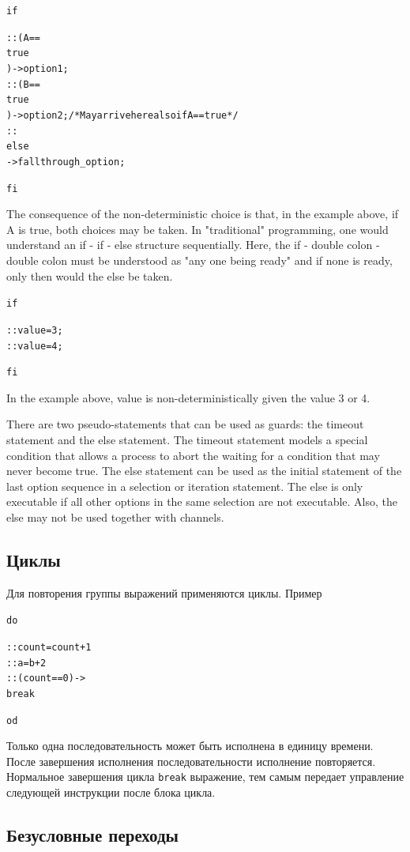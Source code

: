\documentclass[12pt, twoside]{report}
\newcommand{\cname}[1] {
\textcolor{atnotation}{#1}
}
\begin{document}
\begin{alltt}
\cname{if}
:: (A == \cname{true}) -> option1;
:: (B == \cname{true}) -> option2; /* May arrive here also if A==true */
:: \cname{else} -> fallthrough_option;
\cname{fi}
\end{alltt}
The consequence of the non-deterministic choice is that, in the example above, if A is true,
both choices may be taken. In "traditional" programming, one would understand an
if - if - else structure sequentially. Here, the if - double colon - double colon must be
understood as "any one being ready" and if none is ready, only then would the else be taken.
\begin{alltt}
\cname{if}
:: value = 3;
:: value = 4;
\cname{fi}
\end{alltt}
In the example above, value is non-deterministically given the value 3 or 4.

There are two pseudo-statements that can be used as guards: the timeout statement
and the else statement. The timeout statement models a special condition that allows
a process to abort the waiting for a condition that may never become true. The else
statement can be used as the initial statement of the last option sequence in a selection
or iteration statement. The else is only executable if all other options in the same
 selection are not executable. Also, the else may not be used together with channels.

\subsection*{Циклы}\label{promela_language_LOOP}

Для повторения группы выражений применяются циклы. Пример
\begin{alltt}
\cname{do}
  :: count = count + 1
  :: a = b + 2
  :: (count == 0) -> \cname{break}
\cname{od}
\end{alltt}
Только одна последовательность может быть исполнена в единицу времени. После
завершения исполнения последовательности исполнение повторяется. Нормальное
завершения цикла \texttt{break} выражение, тем самым передает управление следующей
инструкции после блока цикла.

\subsection*{Безусловные переходы}\label{promela_language_GOTO}
\end{document}
